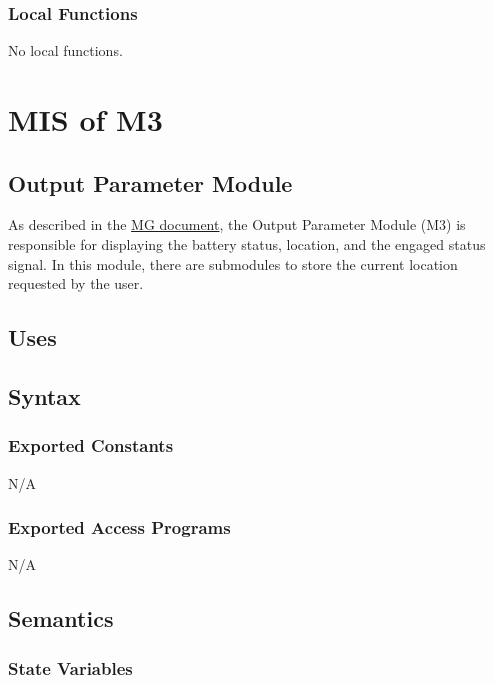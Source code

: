 \documentclass[12pt, titlepage]{article}
\begin{document}
\subsubsection{Local Functions}

No local functions.



\section{MIS of M3} \label{OutputParameters} 

\subsection{Output Parameter Module}

As described in the \href{https://github.com/NevoAbigail/Capstone/blob/main/docs/Design/SoftArchitecture/MG.pdf}{MG document}, the Output Parameter Module (M3) is responsible for displaying the battery status, location, and the engaged status signal. In this module, there are submodules to store the current location requested by the user. 

\subsection{Uses}


\subsection{Syntax}

\subsubsection{Exported Constants}

N/A

\subsubsection{Exported Access Programs}

N/A

\subsection{Semantics}

\subsubsection{State Variables}
\end{document}
